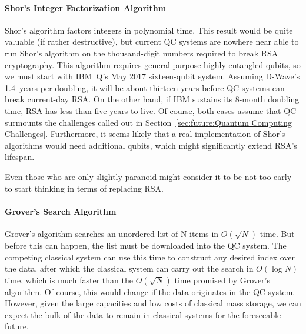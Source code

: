 \paragraph{Shor's Integer Factorization Algorithm}
\label{sec:future:Shor's Integer Factorization Algorithm}

Shor's algorithm factors integers in polynomial time.
This result would be quite valuable (if rather destructive),
but current QC systems are nowhere near able to run
Shor's algorithm on the thousand-digit numbers required
to break RSA cryptography.
This algorithm requires general-purpose highly entangled qubits,
so we must start with IBM~Q's May 2017 sixteen-qubit system.
Assuming D-Wave's 1.4~years per doubling, it will be about thirteen
years before QC systems can break current-day RSA.
On the other hand, if IBM sustains its 8-month doubling time, RSA has
less than five years to live.
Of course, both cases assume that QC surmounts the challenges called
out in Section~\ref{sec:future:Quantum Computing Challenges}.
Furthermore, it seems likely that a real implementation of Shor's
algorithms would need additional qubits, which might significantly extend
RSA's lifespan.

Even those who are only slightly paranoid might consider it to be not
too early to start thinking in terms of replacing RSA.

\paragraph{Grover's Search Algorithm}
\label{sec:future:Grover's Search Algorithm}

Grover's algorithm searches an unordered list of N items
in $O(\sqrt N)$ time.
But before this can happen, the list must be downloaded into
the QC system.
The competing classical system can use this time to construct
any desired index over the data, after which the classical
system can carry out the search in $O(\log N)$ time, which
is much faster than the $O(\sqrt N)$ time promised by
Grover's algorithm.
Of course, this would change if the data originates in the
QC system.
However, given the large capacities and low costs of
classical mass storage, we can expect the bulk of the data to remain
in classical systems for the foreseeable future.

